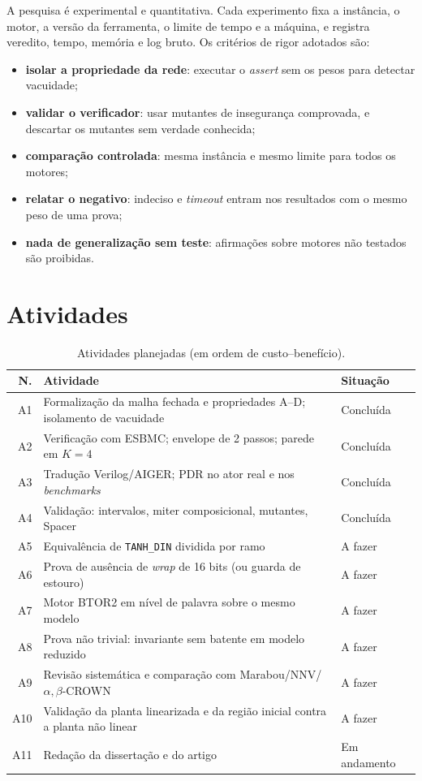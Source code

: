 A pesquisa é experimental e quantitativa. Cada experimento fixa a instância, o motor, a versão da ferramenta, o limite de tempo e a máquina, e registra veredito, tempo, memória e log bruto. Os critérios de rigor adotados são:
\begin{itemize}
  \item \textbf{isolar a propriedade da rede}: executar o \emph{assert} sem os pesos para detectar vacuidade;
  \item \textbf{validar o verificador}: usar mutantes de insegurança comprovada, e descartar os mutantes sem verdade conhecida;
  \item \textbf{comparação controlada}: mesma instância e mesmo limite para todos os motores;
  \item \textbf{relatar o negativo}: indeciso e \emph{timeout} entram nos resultados com o mesmo peso de uma prova;
  \item \textbf{nada de generalização sem teste}: afirmações sobre motores não testados são proibidas.
\end{itemize}

\section{Atividades}

\begin{table}[htb]
\caption{Atividades planejadas (em ordem de custo--benefício).}\label{tab:ativ}
\centering
\begin{tabular}{r|p{8.2cm}|p{3.2cm}}
\toprule
\textbf{N.} & \textbf{Atividade} & \textbf{Situação} \\
\midrule
A1 & Formalização da malha fechada e propriedades A--D; isolamento de vacuidade & Concluída \\
A2 & Verificação com ESBMC; envelope de 2 passos; parede em $K{=}4$ & Concluída \\
A3 & Tradução Verilog/AIGER; PDR no ator real e nos \emph{benchmarks} & Concluída \\
A4 & Validação: intervalos, miter composicional, mutantes, Spacer & Concluída \\
A5 & Equivalência de \texttt{TANH\_DIN} dividida por ramo & A fazer \\
A6 & Prova de ausência de \emph{wrap} de 16 bits (ou guarda de estouro) & A fazer \\
A7 & Motor BTOR2 em nível de palavra sobre o mesmo modelo & A fazer \\
A8 & Prova não trivial: invariante sem batente em modelo reduzido & A fazer \\
A9 & Revisão sistemática e comparação com Marabou/NNV/$\alpha,\beta$-CROWN & A fazer \\
A10 & Validação da planta linearizada e da região inicial contra a planta não linear & A fazer \\
A11 & Redação da dissertação e do artigo & Em andamento \\
\bottomrule
\end{tabular}
\end{table}

